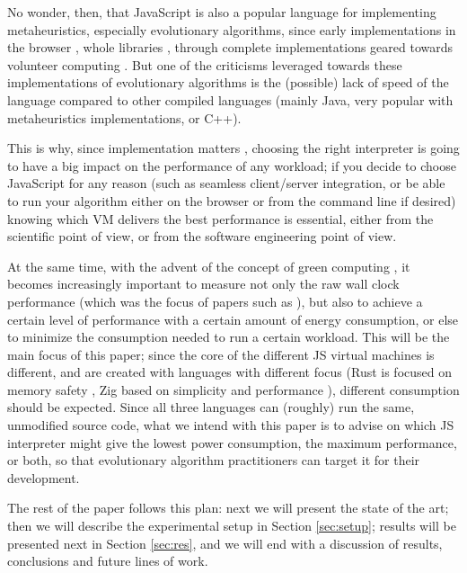 \documentclass[a4paper,twoside]{article}
\begin{document}
No wonder, then, that JavaScript is also a popular language for implementing metaheuristics, especially evolutionary algorithms, since early implementations in the browser \cite{smith1996ga,jesusIWANN99,langdon2004global}, whole libraries \cite{EvoStar2014:jsEO}, through complete implementations geared towards volunteer computing \cite{2016arXiv160101607M}. But one of the criticisms leveraged towards these implementations of evolutionary algorithms is the (possible) lack of speed of the language compared to other compiled languages (mainly Java, very popular with metaheuristics implementations, or C++).

This is why, since implementation matters \cite{DBLP:conf/iwann/MereloRACML11}, choosing the right interpreter is going to have a big impact on the performance of any workload; if you decide to choose JavaScript for any reason (such as seamless client/server integration, or be able to run your algorithm either on the browser or from the command line if desired) knowing which VM delivers the best performance is essential, either from the scientific point of view, or from the software engineering point of view.

At the same time, with the advent of the concept of green computing \cite{kurp2008green}, it becomes increasingly important to measure not only the raw wall clock performance (which was the focus of papers such as \cite{DBLP:conf/evoW/GuervosBCRGRVHR17}), but also to achieve a certain level of performance with a certain amount of energy consumption, or else to minimize the consumption needed to run a certain workload. This will be the main focus of this paper; since the core of the different JS virtual machines is different, and are created with languages with different focus (Rust is focused on memory safety \cite{noseda2022rust}, Zig based on simplicity and performance \cite{zig}), different consumption should be expected. Since all three languages can (roughly) run the same, unmodified source code, what we intend with this paper is to advise on which JS interpreter might give the lowest power consumption, the maximum performance, or both, so that evolutionary algorithm practitioners can target it for their development.

The rest of the paper follows this plan: next we will present the state of the art; then we will describe the experimental setup in Section \ref{sec:setup}; results will be presented next in Section \ref{sec:res}, and we will end with a discussion of results, conclusions and future lines of work.
\end{document}
